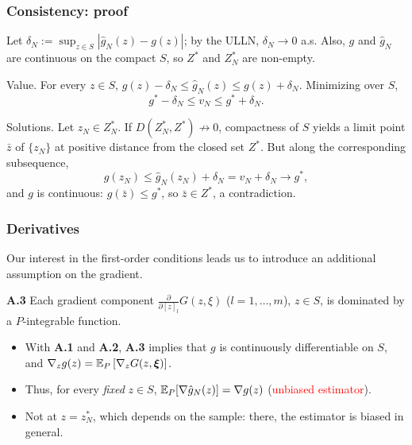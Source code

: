 \documentclass[aspectratio=169]{beamer}
\begin{document}
\begin{frame}
\frametitle{Consistency: proof}

Let $\delta_N := \sup_{z \in S} | \hat{g}_N(z) - g(z) |$; by the ULLN, $\delta_N \rightarrow 0$ a.s. Also, $g$ and $\hat{g}_N$ are continuous on the compact $S$, so $Z^*$ and $Z^*_N$ are non-empty.

\mbox{}

{\blue Value.} For every $z \in S$, $g(z) - \delta_N \leq \hat{g}_N(z) \leq g(z) + \delta_N$. Minimizing over $S$,
\[
g^* - \delta_N \leq v_N \leq g^* + \delta_N.
\]

{\blue Solutions.} Let $z_N \in Z^*_N$. If $D(Z^*_N, Z^*) \not\rightarrow 0$, compactness of $S$ yields a limit point $\bar{z}$ of $\lbrace z_N \rbrace$ at positive distance from the closed set $Z^*$. But along the corresponding subsequence,
\[
g(z_N) \leq \hat{g}_N(z_N) + \delta_N = v_N + \delta_N \rightarrow g^*,
\]
and $g$ is continuous: $g(\bar{z}) \leq g^*$, so $\bar{z} \in Z^*$, a contradiction.

\end{frame}

\begin{frame}
\frametitle{Derivatives}

Our interest in the first-order conditions leads us to introduce an additional assumption on the gradient.

\mbox{}

\noindent
\textbf{A.3}
Each gradient component $\frac{\partial}{\partial [z]_l} G(z, \xi)$ ($l = 1,\ldots,m$), $z \in S$, is dominated by a $P$-integrable function.

\begin{itemize}
	\item 
	With \textbf{A.1} and \textbf{A.2}, \textbf{A.3} implies that $g$ is continuously differentiable on $S$, and
	$\nabla_z g(z) = {\mathbb{E}}_P\left[ \nabla_z G(z, {\boldsymbol{\xi}}) \right]$.
	\item
	Thus, for every {\it fixed} $z \in S$, ${\mathbb{E}}_P [\nabla \hat{g}_N(z)] = \nabla g(z)$ (\textcolor{red}{unbiased estimator}).
	\item
	Not at $z = z_N^*$, which depends on the sample: there, the estimator is biased in general.
\end{itemize}

\end{frame}
\end{document}
